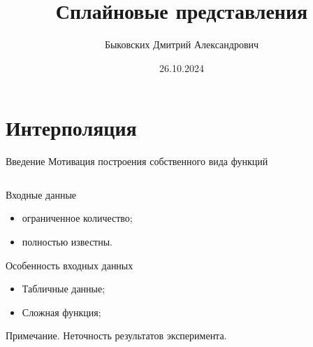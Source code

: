 \documentclass{beamer}
\title[Сплайны]{Сплайновые представления}
\author[Быковских Д.А.]{Быковских Дмитрий Александрович}
\date{26.10.2024}
\begin{document}
	\begin{frame}
		\titlepage
	\end{frame}

	\section{Интерполяция}

	\begin{frame}{Введение} {Мотивация построения собственного вида функций}
	
		\begin{columns}
			\begin{column}{0.5\textwidth}
				Входные данные
				\begin{itemize}
					\item ограниченное количество;
					\item полностью известны.
				\end{itemize}
				Особенность входных данных
				\begin{itemize}
					\item Табличные данные;
					\item Сложная функция;
				\end{itemize}
				Примечание. Неточность результатов эксперимента.
					

\end{column}
\end{columns}
\end{frame}
\end{document}
